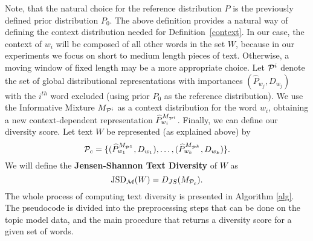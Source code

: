 Note, that the natural choice for the reference distribution $P$ is
the previously defined prior distribution $P_0$.
The above definition provides a natural way of defining the context
distribution needed for Definition~\ref{context}. 
In our case, the context of $w_i$ will be composed of
all other words in the set $W$, because in our experiments we
focus on short to medium length pieces of text. Otherwise, a moving
window of fixed length may be a more appropriate choice. Let
${\mathcal P}^i$ denote the set of global distributional representations
with importances $(\widehat{P}_{w_j},D_{w_j})$ with the $i^{th}$ word
excluded (using prior $P_0$ as the reference
distribution). We use the Informative Mixture 
$M_{{\mathcal P}^i}$ as a context distribution for the word 
$w_i$, obtaining a new context-dependent representation
$\widehat{P}^{M_{{\mathcal P}^i}}_{w_i}$. Finally, we can define our diversity
score.
\bed\label{text-diversity}
 Let text $W$ be represented (as explained above) by
\[{\mathcal P}_c=\{(\widehat{P}^{M_{{\mathcal P}^1}}_{w_1},D_{w_1}),\dots,
(\widehat{P}^{M_{{\mathcal P}^k}}_{w_k},D_{w_k})\}.\] 
We will define the
{\bf Jensen-Shannon Text Diversity} of $W$ as
\[\textrm{JSD}_{\mathcal M}(W) = D_{JS}(M_{{\mathcal P}_c}).\]
\eed
The whole process of computing text diversity is
presented in Algorithm \ref{alg}. The pseudocode is divided into the
preprocessing steps that can be done on the topic model data, and the
main procedure that returns a diversity score for a given set of words.

